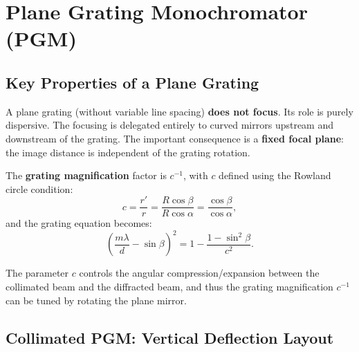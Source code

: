 \documentclass[12pt,a4paper]{article}
\newcommand{\placeholder}[4][\linewidth]{%
  \begin{figure}[H]
    \centering
    \begin{tikzpicture}
      \draw[fill=plbg, draw=plframe, line width=1pt, dashed]
            (0,0) rectangle (#1, #2);
      \draw[plframe, line width=0.4pt] (0,0) -- (#1,#2);
      \draw[plframe, line width=0.4pt] (#1,0) -- (0,#2);
      \node[anchor=north west, font=\small\bfseries\color{plframe},
            inner sep=4pt] at (0,#2) {#3};
      \node[anchor=center, font=\small\itshape\color{pltext},
            text width=0.75\linewidth, align=center]
            at ({0.5*#1},{0.5*#2}) {#4};
    \end{tikzpicture}
  \end{figure}
}
\newcommand{\al}{\alpha}
\newcommand{\be}{\beta}
\newcommand{\la}{\lambda}
\begin{document}
\section{Plane Grating Monochromator (PGM)}

\subsection{Key Properties of a Plane Grating}

A plane grating (without variable line spacing) \textbf{does not focus}.  Its role is
purely dispersive.  The focusing is delegated entirely to curved mirrors upstream and
downstream of the grating.  The important consequence is a \textbf{fixed focal plane}:
the image distance is independent of the grating rotation.

The \textbf{grating magnification} factor is $c^{-1}$, with $c$ defined using the Rowland circle condition:
\begin{equation}
  c = \frac{r'}{r} = \frac{R \cos\be}{R \cos\al} = \frac{\cos\be}{\cos\al},
  \label{eq:c_factor}
\end{equation}
and the grating equation becomes:
\begin{equation}
  \left( \frac{m\la}{d} - \sin\be \right)^2 = 1 - \frac{1-\sin^2\be}{c^2}.
  \label{eq:PGM_grating}
\end{equation}

The parameter $c$ controls the angular compression/expansion between the collimated beam
and the diffracted beam, and thus the grating magnification $c^{-1}$ can be
tuned by rotating the plane mirror.


\subsection{Collimated PGM: Vertical Deflection Layout}
\end{document}
